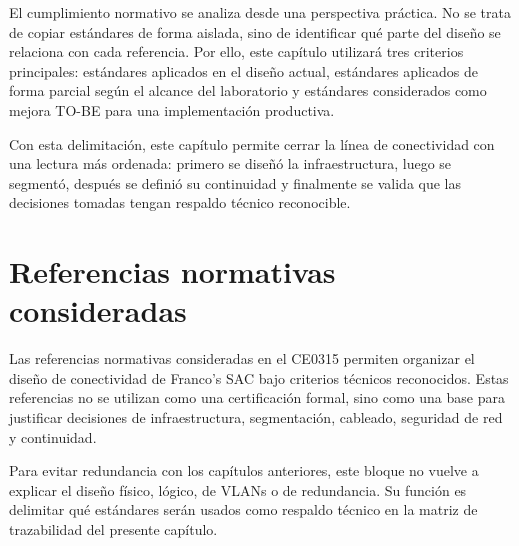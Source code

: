 \documentclass[11pt, a4paper, oneside]{report}
\begin{document}
\normalsize

El cumplimiento normativo se analiza desde una perspectiva práctica. No se trata de copiar estándares de forma aislada, sino de identificar qué parte del diseño se relaciona con cada referencia. Por ello, este capítulo utilizará tres criterios principales: estándares aplicados en el diseño actual, estándares aplicados de forma parcial según el alcance del laboratorio y estándares considerados como mejora TO-BE para una implementación productiva.

Con esta delimitación, este capítulo permite cerrar la línea de conectividad con una lectura más ordenada: primero se diseñó la infraestructura, luego se segmentó, después se definió su continuidad y finalmente se valida que las decisiones tomadas tengan respaldo técnico reconocible.

\section{Referencias normativas consideradas}

Las referencias normativas consideradas en el CE0315 permiten organizar el diseño de conectividad de Franco's SAC bajo criterios técnicos reconocidos. Estas referencias no se utilizan como una certificación formal, sino como una base para justificar decisiones de infraestructura, segmentación, cableado, seguridad de red y continuidad.

Para evitar redundancia con los capítulos anteriores, este bloque no vuelve a explicar el diseño físico, lógico, de VLANs o de redundancia. Su función es delimitar qué estándares serán usados como respaldo técnico en la matriz de trazabilidad del presente capítulo.

\renewcommand{\arraystretch}{1.3}
\footnotesize
{}
\end{document}
